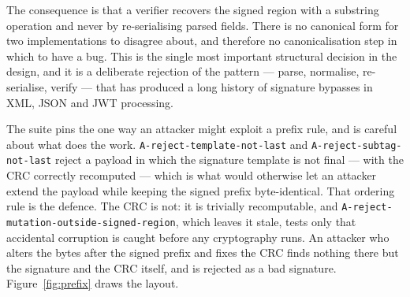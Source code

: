 \documentclass[10pt,a4paper,twocolumn]{article}
\newcommand{\code}[1]{\texttt{\small #1}}
\begin{document}
The consequence is that a verifier recovers the signed region with a substring
operation and never by re-serialising parsed fields. There is no canonical form
for two implementations to disagree about, and therefore no canonicalisation
step in which to have a bug. This is the single most important structural
decision in the design, and it is a deliberate rejection of the pattern --- parse,
normalise, re-serialise, verify --- that has produced a long history of signature
bypasses in XML, JSON and JWT processing.

The suite pins the one way an attacker might exploit a prefix rule, and is
careful about what does the work. \code{A-reject-\allowbreak template-\allowbreak not-last} and
\code{A-reject-\allowbreak subtag-\allowbreak not-last} reject a payload in which the signature template
is not final --- with the CRC correctly recomputed --- which is what would
otherwise let an attacker extend the payload while keeping the signed prefix
byte-identical. That ordering rule is the defence. The CRC is not: it is
trivially recomputable, and \code{A-reject-\allowbreak mutation-\allowbreak outside-\allowbreak signed-\allowbreak region},
which leaves it stale, tests only that accidental corruption is caught before
any cryptography runs. An attacker who alters the bytes after the signed prefix
and fixes the CRC finds nothing there but the signature and the CRC itself, and
is rejected as a bad signature. Figure~\ref{fig:prefix} draws the layout.
\end{document}
